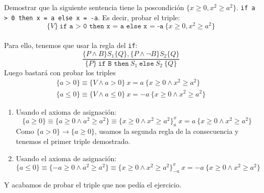 \begin{ejercicio}
    Demostrar que la siguiente sentencia tiene la poscondición ${\{x\geq 0, x^2\geq a^2\}}$.
    \verb|if a > 0 then x = a else x = -a|. Es decir, probar el triple:
    \begin{equation*}
        \{V\}\ \texttt{if a >\ 0 then x = a else x = -a}\ \{x\geq 0, x^2\geq a^2\}
    \end{equation*}~\\
    Para ello, tenemos que usar la regla del \verb|if|:
    \begin{equation*}
        \dfrac{\{P\land B\}S_1\{Q\}, \{P\land \lnot B\}S_2\{Q\}}{\{P\}\ \texttt{if B then}\ S_1\ \texttt{else}\ S_2\ \{Q\}}
    \end{equation*}
    Luego bastará con probar los triples
    \begin{gather*}
        \{a>0\} \equiv \{V \land a > 0\}\ x=a\ \{x\geq 0 \land x^2\geq a^2\} \\
        \{a\leq 0\} \equiv \{V \land a \leq 0\}\ x=-a\ \{x\geq 0 \land x^2\geq a^2\}
    \end{gather*}
    \begin{enumerate}
        \item Usando el axioma de asignación:
            \begin{equation*}
                \{a \geq 0\} \equiv \{a \geq 0 \land a^2 \geq a^2\} \equiv \{x\geq 0 \land x^2\geq a^2\}^x_{a}\ x=a\ \{x\geq 0 \land x^2\geq a^2\}
            \end{equation*}
            Como $\{a>0\}\rightarrow\{a\geq 0\}$, usamos la segunda regla de la consecuencia y tenemos el primer triple demostrado.
        \item Usando el axioma de asignación:
            \begin{equation*}
                \{a \leq 0\} \equiv \{-a \geq 0 \land a^2 \geq a^2\} \equiv \{x\geq 0 \land x^2\geq a^2\}^x_{-a}\ x=-a\ \{x\geq 0 \land x^2\geq a^2\}
            \end{equation*}
    \end{enumerate}
    Y acabamos de probar el triple que nos pedía el ejercicio.
\end{ejercicio}

